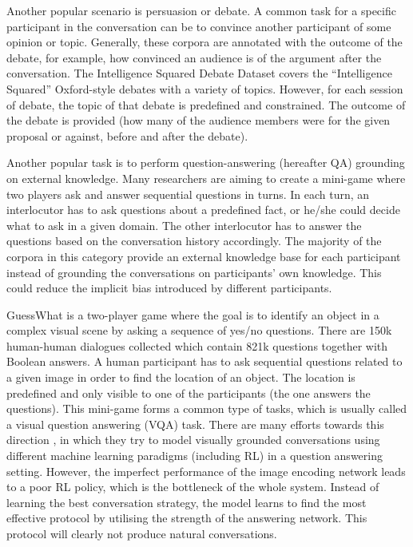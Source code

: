 \documentclass[bsc,frontabs,twoside,singlespacing,parskip,deptreport]{infthesis}     %
\begin{document}
Another popular scenario is persuasion or debate. A common task for a specific participant in the conversation can be to convince another participant of some opinion or topic. Generally, these corpora are annotated with the outcome of the debate, for example, how convinced an audience is of the argument after the conversation. The Intelligence Squared Debate Dataset \cite{zhang2016conversational} covers the “Intelligence Squared” Oxford-style debates with a variety of topics. However, for each session of debate, the topic of that debate is predefined and constrained. The outcome of the debate is provided (how many of the audience members were for the given proposal or against, before and after the debate).

Another popular task is to perform question-answering (hereafter QA) grounding on external knowledge. Many researchers are aiming to create a mini-game where two players ask and answer sequential questions in turns. In each turn, an interlocutor has to ask questions about a predefined fact, or he/she could decide what to ask in a given domain. The other interlocutor has to answer the questions based on the conversation history accordingly. The majority of the corpora in this category provide an external knowledge base for each participant instead of grounding the conversations on participants' own knowledge. This could reduce the implicit bias introduced by different participants.

GuessWhat \cite{de2017guesswhat} is a two-player game where the goal is to identify an object in a complex visual scene by asking a sequence of yes/no questions. There are 150k human-human dialogues collected which contain 821k questions together with Boolean answers. A human participant has to ask sequential questions related to a given image in order to find the location of an object. The location is predefined and only visible to one of the participants (the one answers the questions). This mini-game forms a common type of tasks, which is usually called a visual question answering (VQA) task. There are many efforts towards this direction \cite{strub2017end,shekhar2017foil,reddy2019coqa,zhou2018dataset,de2017guesswhat,das2017visual,das2017learning}, in which they try to model visually grounded conversations using different machine learning paradigms (including RL) in a question answering setting. However, the imperfect performance of the image encoding network leads to a poor RL policy, which is the bottleneck of the whole system. Instead of learning the best conversation strategy, the model learns to find the most effective protocol by utilising the strength of the answering network. This protocol will clearly not produce natural conversations.
\end{document}
